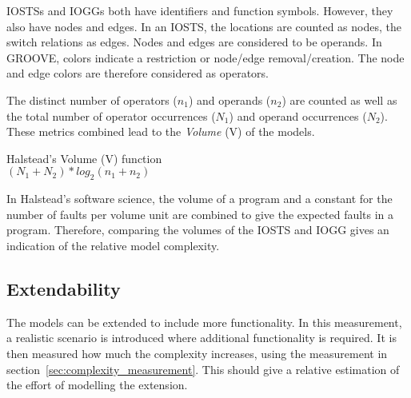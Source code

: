 IOSTSs and IOGGs both have identifiers and function symbols. However, they also have nodes and edges. In an IOSTS, the locations are counted as nodes, the switch relations as edges. Nodes and edges are considered to be operands. In GROOVE, colors indicate a restriction or node/edge removal/creation. The node and edge colors are therefore considered as operators.

The distinct number of operators ($n_1$) and operands ($n_2$) are counted as well as the total number of operator occurrences ($N_1$) and operand occurrences ($N_2$). These metrics combined lead to the \textit{Volume} (V) of the models.
\vspace{10px}\begin{definition} Halstead's Volume (V) function \\
$(N_1+N_2)*\mathit{log}_2(n_1+n_2)$
\end{definition}\vspace{10px}
In Halstead's software science, the volume of a program and a constant for the number of faults per volume unit are combined to give the expected faults in a program. Therefore, comparing the volumes of the IOSTS and IOGG gives an indication of the relative model complexity.

\begin{comment}
\paragraph*{Cyclomatic Complexity} COMMENT Ik heb intensief emails gewisseld met Lodewijk Bergmans over de toepassing van cyclomatic complexity, maar dit lijkt niet geschikt hier. Ik zal het wel behandelen $/$COMMENT

\paragraph*{System Complexity} COMMENT mooie, simpele metric voor OO. Niet toepasbaar hier, want onmogelijk om modules te definieren $/$COMMENT
\end{comment}

\subsection{Extendability}
The models can be extended to include more functionality. In this measurement, a realistic scenario is introduced where additional functionality is required. It is then measured how much the complexity increases, using the measurement in section~\ref{sec:complexity_measurement}. This should give a relative estimation of the effort of modelling the extension.

